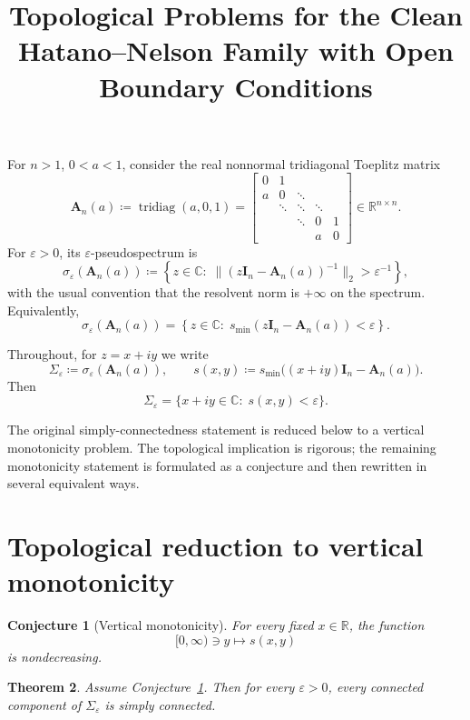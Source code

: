 \documentclass[11pt]{article}
\title{Topological Problems for the Clean Hatano--Nelson Family with Open Boundary Conditions}
\author{}
\date{}
\newtheorem{theorem}{Theorem}
\newtheorem{conjecture}[theorem]{Conjecture}
\begin{document}
\maketitle

For \(n>1\), \(0<a<1\), consider the real nonnormal tridiagonal Toeplitz matrix
\[
\mathbf A_n(a)\coloneqq\operatorname{tridiag}(a,0,1)
=
\begin{bmatrix}
0 & 1 \\
a & 0 & \ddots \\
& \ddots & \ddots & \ddots \\
&& \ddots & 0 & 1 \\
&&& a & 0
\end{bmatrix}\in \mathbb{R}^{n\times n}.
\]
For \(\varepsilon>0\), its \(\varepsilon\)-pseudospectrum is
\[
\sigma_\varepsilon(\mathbf A_n(a))
\coloneqq
\left\{
z\in\mathbb C:\;
\|(z\mathbf I_n-\mathbf A_n(a))^{-1}\|_2>\varepsilon^{-1}
\right\},
\]
with the usual convention that the resolvent norm is \(+\infty\) on the spectrum. Equivalently,
\[
\sigma_\varepsilon(\mathbf A_n(a))
=
\left\{
z\in\mathbb C:\;
s_{\min}(z\mathbf I_n-\mathbf A_n(a))<\varepsilon
\right\}.
\]

Throughout, for \(z=x+iy\) we write
\[
\Sigma_\varepsilon\coloneqq \sigma_\varepsilon(\mathbf A_n(a)),
\qquad
s(x,y)\coloneqq s_{\min}\!\bigl((x+iy)\mathbf I_n-\mathbf A_n(a)\bigr).
\]
Then
\[
\Sigma_\varepsilon=\{x+iy\in\mathbb C:\; s(x,y)<\varepsilon\}.
\]

The original simply-connectedness statement is reduced below to a vertical monotonicity problem.  The topological implication is rigorous; the remaining monotonicity statement is formulated as a conjecture and then rewritten in several equivalent ways.

\section{Topological reduction to vertical monotonicity}

\begin{conjecture}[Vertical monotonicity]\label{conj:vertical-monotonicity}
For every fixed \(x\in\mathbb R\), the function
\[
[0,\infty)\ni y\longmapsto s(x,y)
\]
is nondecreasing.
\end{conjecture}

\begin{theorem}\label{thm:components-simply-connected}
Assume Conjecture~\ref{conj:vertical-monotonicity}. Then for every \(\varepsilon>0\), every connected component of
\(\Sigma_\varepsilon\)
is simply connected.
\end{theorem}
\end{document}
